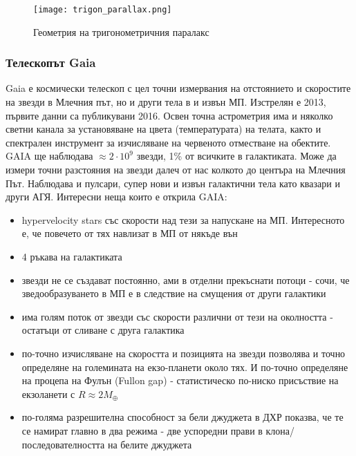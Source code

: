 \documentclass[a4paper,12pt]{article}
\begin{document}
\begin{figure}[h!]
\centering
\texttt{[image: trigon\_parallax.png]}
\caption{Геометрия на тригонометричния паралакс}
\label{fig:trigon_parallax}
\end{figure}

\subsubsection{Телескопът Gaia}
\label{sec:GAIA}
Gaia е космически телескоп с цел точни измервания на отстоянието и скоростите на звезди в Млечния път, но и други тела в и извън МП. Изстрелян е 2013, първите данни са публикувани 2016. Освен точна астрометрия има и няколко светни канала за установяване на цвета (температурата) на телата, както и спектрален инструмент за изчисляване на червеното отместване на обектите. GAIA ще наблюдава $\approx 2 \cdot 10^9$ звезди, 1\% от всичките в галактиката. Може да измери точни разстояния на звезди далеч от нас колкото до центъра на Млечния Път. Наблюдава и пулсари, супер нови и извън галактични тела като квазари и други АГЯ. Интересни неща които е открила GAIA:
\begin{itemize}
\item hypervelocity stars със скорости над тези за напускане на МП. Интересното е, че повечето от тях навлизат в МП от някъде вън
\item 4 ръкава на галактиката
\item звезди не се създават постоянно, ами в отделни прекъснати потоци - сочи, че зведообразуването в МП е в следствие на смущения от други галактики
\item има голям поток от звезди със скорости различни от тези на околността - остатъци от сливане с друга галактика
\item по-точно изчисляване на скоростта и позицията на звезди позволява и точно определяне на големината на екзо-планети около тях. И по-точно определяне на процепа на Фулън (Fullon gap) - статистическо по-ниско присъствие на екзоланети с $R \approx 2M_\oplus$
\item по-голяма разрешителна способност за бели джуджета в ДХР показва, че те се намират главно в два режима - две успоредни прави в клона/последователността на белите джуджета
\end{itemize}
\end{document}
